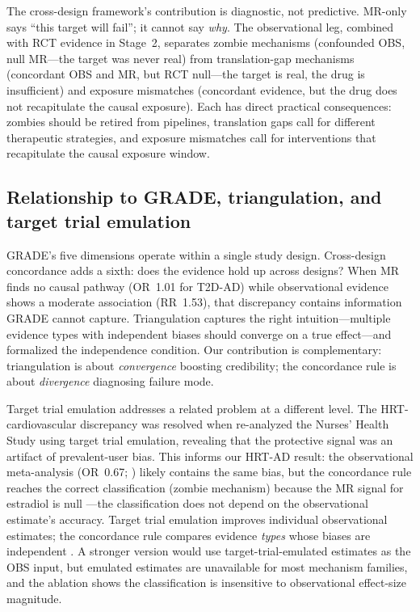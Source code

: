 \documentclass[11pt]{article}
\begin{document}
The cross-design framework's contribution is diagnostic, not predictive. MR-only says ``this target will fail''; it cannot say \emph{why}. The observational leg, combined with RCT evidence in Stage~2, separates zombie mechanisms (confounded OBS, null MR---the target was never real) from translation-gap mechanisms (concordant OBS and MR, but RCT null---the target is real, the drug is insufficient) and exposure mismatches (concordant evidence, but the drug does not recapitulate the causal exposure). Each has direct practical consequences: zombies should be retired from pipelines, translation gaps call for different therapeutic strategies, and exposure mismatches call for interventions that recapitulate the causal exposure window.

\subsection{Relationship to GRADE, triangulation, and target trial emulation}

GRADE's five dimensions operate within a single study design. Cross-design concordance adds a sixth: does the evidence hold up across designs? When MR finds no causal pathway (OR~1.01 for T2D-AD) while observational evidence shows a moderate association (RR~1.53), that discrepancy contains information GRADE cannot capture. Triangulation \cite{lawlor2016,munafo2018} captures the right intuition---multiple evidence types with independent biases should converge on a true effect---and \citet{hammerton2021} formalized the independence condition. Our contribution is complementary: triangulation is about \emph{convergence} boosting credibility; the concordance rule is about \emph{divergence} diagnosing failure mode.

Target trial emulation \cite{hernan2016} addresses a related problem at a different level. The HRT-cardiovascular discrepancy was resolved when \citet{hernan2008} re-analyzed the Nurses' Health Study using target trial emulation, revealing that the protective signal was an artifact of prevalent-user bias. This informs our HRT-AD result: the observational meta-analysis (OR~0.67; \cite{song2020}) likely contains the same bias, but the concordance rule reaches the correct classification (zombie mechanism) because the MR signal for estradiol is null \cite{barth2025}---the classification does not depend on the observational estimate's accuracy. Target trial emulation improves individual observational estimates; the concordance rule compares evidence \emph{types} whose biases are independent \cite{daveysmith2014,gill2024pitfalls,munafo2018}. A stronger version would use target-trial-emulated estimates as the OBS input, but emulated estimates are unavailable for most mechanism families, and the ablation shows the classification is insensitive to observational effect-size magnitude.
\end{document}
